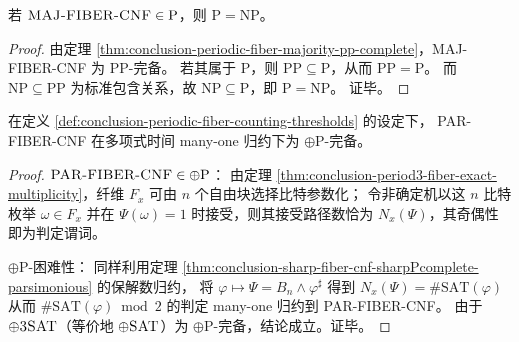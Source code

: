 \begin{corollary}[多数判定的多项式可解性蕴含 \texorpdfstring{\(\mathrm{P}=\mathrm{NP}\)}{P=NP}]\label{cor:conclusion-periodic-fiber-majority-p-implies-pnp}
若 \(\text{\normalfont\textsc{MAJ-FIBER-CNF}}\in \mathrm{P}\)，则 \(\mathrm{P}=\mathrm{NP}\)。
\end{corollary}
\begin{proof}
由定理 \ref{thm:conclusion-periodic-fiber-majority-pp-complete}，\textsc{MAJ-FIBER-CNF} 为 \(\mathrm{PP}\)-完备。
若其属于 \(\mathrm{P}\)，则 \(\mathrm{PP}\subseteq \mathrm{P}\)，从而 \(\mathrm{PP}=\mathrm{P}\)。
而 \(\mathrm{NP}\subseteq \mathrm{PP}\) 为标准包含关系，故 \(\mathrm{NP}\subseteq \mathrm{P}\)，即 \(\mathrm{P}=\mathrm{NP}\)。
证毕。
\end{proof}

\begin{theorem}\label{thm:conclusion-periodic-fiber-parity-oplusP-complete}
在定义 \ref{def:conclusion-periodic-fiber-counting-thresholds} 的设定下，
{\normalfont\textsc{PAR-FIBER-CNF}} 在多项式时间 many-one 归约下为 \(\oplus\mathrm{P}\)-完备。
\end{theorem}
\begin{proof}
\(\textsc{PAR-FIBER-CNF}\in\oplus\mathrm{P}\)：
由定理 \ref{thm:conclusion-period3-fiber-exact-multiplicity}，纤维 \(F_x\) 可由 \(n\) 个自由块选择比特参数化；
令非确定机以这 \(n\) 比特枚举 \(\omega\in F_x\) 并在 \(\Psi(\omega)=1\) 时接受，则其接受路径数恰为 \(N_x(\Psi)\)，其奇偶性即为判定谓词。
\par
\(\oplus\mathrm{P}\)-困难性：
同样利用定理 \ref{thm:conclusion-sharp-fiber-cnf-sharpPcomplete-parsimonious} 的保解数归约，
将 \(\varphi\mapsto \Psi=B_n\wedge\varphi^\sharp\) 得到
\(
N_x(\Psi)=\#\mathrm{SAT}(\varphi)
\)
从而 \(\#\mathrm{SAT}(\varphi)\bmod 2\) 的判定 many-one 归约到 \textsc{PAR-FIBER-CNF}。
由于 \(\oplus\textsc{3SAT}\)（等价地 \(\oplus\textsc{SAT}\)）为 \(\oplus\mathrm{P}\)-完备，结论成立。证毕。
\end{proof}

